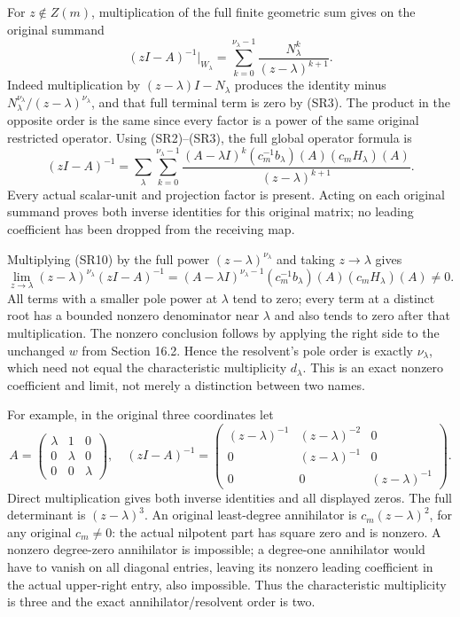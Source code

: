 \documentclass[
  11pt,
]{article}
\begin{document}
For \(z\notin Z(m)\), multiplication of the full finite geometric sum
gives on the original summand \[
 (zI-A)^{-1}|_{W_\lambda}
   =\sum_{k=0}^{\nu_\lambda-1}
                         \frac{N_\lambda^k}{(z-\lambda)^{k+1}}.
                                                               \tag{SR9}
\] Indeed multiplication by \((z-\lambda)I-N_\lambda\) produces the
identity minus \(N_\lambda^{\nu_\lambda}/(z-\lambda)^{\nu_\lambda}\),
and that full terminal term is zero by (SR3). The product in the
opposite order is the same since every factor is a power of the same
original restricted operator. Using (SR2)--(SR3), the full global
operator formula is \[
 (zI-A)^{-1}
 =\sum_\lambda\sum_{k=0}^{\nu_\lambda-1}
  \frac{(A-\lambda I)^k
        (c_m^{-1}b_\lambda)(A)(c_mH_\lambda)(A)}
       {(z-\lambda)^{k+1}}.                                  \tag{SR10}
\] Every actual scalar-unit and projection factor is present. Acting on
each original summand proves both inverse identities for this original
matrix; no leading coefficient has been dropped from the receiving map.

Multiplying (SR10) by the full power \((z-\lambda)^{\nu_\lambda}\) and
taking \(z\to\lambda\) gives \[
 \lim_{z\to\lambda}(z-\lambda)^{\nu_\lambda}(zI-A)^{-1}
       =(A-\lambda I)^{\nu_\lambda-1}
              (c_m^{-1}b_\lambda)(A)(c_mH_\lambda)(A)\ne0.     \tag{SR11}
\] All terms with a smaller pole power at \(\lambda\) tend to zero;
every term at a distinct root has a bounded nonzero denominator near
\(\lambda\) and also tends to zero after that multiplication. The
nonzero conclusion follows by applying the right side to the unchanged
\(w\) from Section 16.2. Hence the resolvent's pole order is exactly
\(\nu_\lambda\), which need not equal the characteristic multiplicity
\(d_\lambda\). This is an exact nonzero coefficient and limit, not
merely a distinction between two names.

For example, in the original three coordinates let \[
 A=\begin{pmatrix}\lambda&1&0\\0&\lambda&0\\0&0&\lambda\end{pmatrix},
 \quad
 (zI-A)^{-1}=
 \begin{pmatrix}
 (z-\lambda)^{-1}&(z-\lambda)^{-2}&0\\
 0&(z-\lambda)^{-1}&0\\0&0&(z-\lambda)^{-1}
 \end{pmatrix}.                                               \tag{SR12}
\] Direct multiplication gives both inverse identities and all displayed
zeros. The full determinant is \((z-\lambda)^3\). An original
least-degree annihilator is \(c_m(z-\lambda)^2\), for any original
\(c_m\ne0\): the actual nilpotent part has square zero and is nonzero. A
nonzero degree-zero annihilator is impossible; a degree-one annihilator
would have to vanish on all diagonal entries, leaving its nonzero
leading coefficient in the actual upper-right entry, also impossible.
Thus the characteristic multiplicity is three and the exact
annihilator/resolvent order is two.
\end{document}

